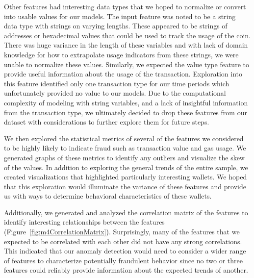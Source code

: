 \documentclass[sigconf]{acmart}
\begin{document}
Other features had interesting data types that we hoped to normalize or convert into usable values for our models. The input feature was noted to be a string data type with strings on varying lengths. These appeared to be strings of addresses or hexadecimal values that could be used to track the usage of the coin. There was huge variance in the length of these variables and with lack of domain knowledge for how to extrapolate usage indicators from these strings, we were unable to normalize these values. Similarly, we expected the value type feature to provide useful information about the usage of the transaction. Exploration into this feature identified only one transaction type for our time periods which unfortunately provided no value to our models. Due to the computational complexity of modeling with string variables, and a lack of insightful information from the transaction type, we ultimately decided to drop these features from our dataset with considerations to further explore them for future steps. 

We then explored the statistical metrics of several of the features we considered to be highly likely to indicate fraud such as transaction value and gas usage. We generated graphs of these metrics to identify any outliers and visualize the skew of the values. In addition to exploring the general trends of the entire sample, we created visualizations that highlighted particularly interesting wallets. We hoped that this exploration would illuminate the variance of these features and provide us with ways to determine behavioral characteristics of these wallets.   

Additionally, we generated and analyzed the correlation matrix of the features to identify interesting relationships between the features (Figure~\ref{fig:m4CorrelationMatrix}). Surprisingly, many of the features that we expected to be correlated with each other did not have any strong correlations. This indicated that our anomaly detection would need to consider a wider range of features to characterize potentially fraudulent behavior since no two or three features could reliably provide information about the expected trends of another. 
\end{document}
